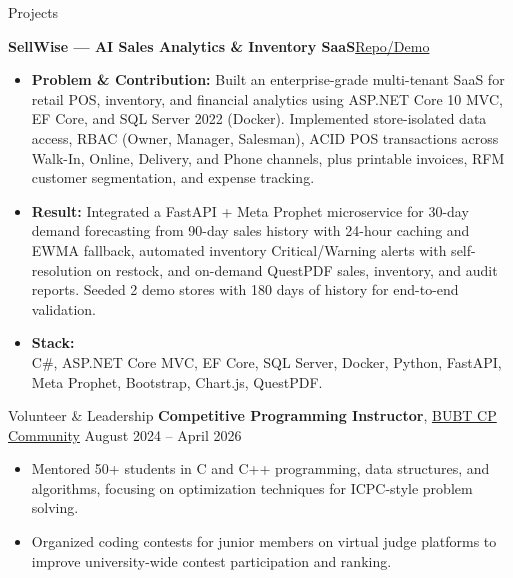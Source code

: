\documentclass{resume}
\newcommand{\sellwiseRepo}{https://github.com/mr-sohel/SellWise}
\newcommand{\projecttitle}[2]{%
    \textbf{#1}\hfill{\footnotesize\href{#2}{Repo/Demo}}%
}
\begin{document}
\hspace{0.04\textwidth}%
\begin{minipage}[t]{0.46\textwidth}
\vspace{0pt}


\begin{rSection}{Projects}

\projecttitle{SellWise --- AI Sales Analytics \& Inventory SaaS}{\sellwiseRepo}
\vspace{4pt}
\begin{itemize}
    \item {\bf Problem \& Contribution:} Built an enterprise-grade multi-tenant SaaS for retail POS, inventory, and financial analytics using ASP.NET Core 10 MVC, EF Core, and SQL Server 2022 (Docker). Implemented store-isolated data access, RBAC (Owner, Manager, Salesman), ACID POS transactions across Walk-In, Online, Delivery, and Phone channels, plus printable invoices, RFM customer segmentation, and expense tracking.

    \item {\bf Result:} Integrated a FastAPI + Meta Prophet microservice for 30-day demand forecasting from 90-day sales history with 24-hour caching and EWMA fallback, automated inventory Critical/Warning alerts with self-resolution on restock, and on-demand QuestPDF sales, inventory, and audit reports. Seeded 2 demo stores with 180 days of history for end-to-end validation.

    \item {\bf Stack:}\\
    C\#, ASP.NET Core MVC, EF Core, SQL Server, Docker, Python, FastAPI, Meta Prophet, Bootstrap, Chart.js, QuestPDF.
\end{itemize}

\end{rSection}




\begin{rSection}{Volunteer \& Leadership}
\textbf{Competitive Programming Instructor}, \newline
\href{https://www.facebook.com/CPBUBT}{BUBT CP Community}
\hfill August 2024 -- April 2026
\vspace{4pt}
\begin{itemize}
    \item Mentored 50+ students in C and C++ programming, data structures, and algorithms, focusing on optimization techniques for ICPC-style problem solving.
    \item Organized coding contests for junior members on virtual judge platforms to improve university-wide contest participation and ranking.
\end{itemize}



\end{rSection}
\end{minipage}
\end{document}
